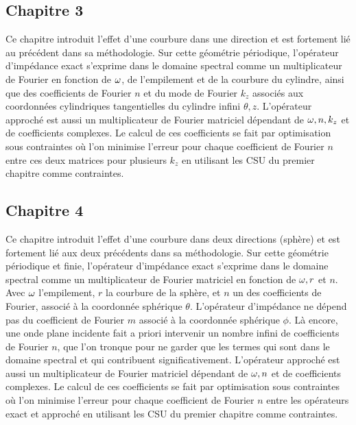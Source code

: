 \subsection*{Chapitre 3}
Ce chapitre introduit l'effet d'une courbure dans une direction et est fortement lié au précédent dans sa méthodologie.
Sur cette géométrie périodique, l'opérateur d'impédance exact s'exprime dans le domaine spectral comme un multiplicateur de Fourier en fonction de \(\omega\), de l'empilement et de la courbure du cylindre, ainsi que des coefficients de Fourier \(n\) et du mode de Fourier \(k_z\) associés aux coordonnées cylindriques tangentielles du cylindre infini \(\theta,z\).
L'opérateur approché est aussi un multiplicateur de Fourier matriciel dépendant de \(\omega, n, k_z\) et de coefficients complexes.
Le calcul de ces coefficients se fait par optimisation sous contraintes où l'on minimise l'erreur pour chaque coefficient de Fourier \(n\) entre ces deux matrices pour plusieurs \(k_z\) en utilisant les CSU du premier chapitre comme contraintes.

\subsection*{Chapitre 4}
Ce chapitre introduit l'effet d'une courbure dans deux directions (sphère) et est fortement lié aux deux précédents dans sa méthodologie.
Sur cette géométrie périodique et finie, l'opérateur d'impédance exact s'exprime dans le domaine spectral comme un multiplicateur de Fourier matriciel en fonction de \(\omega, r\) et \(n\). Avec \(\omega\) l'empilement, \(r\) la courbure de la sphère, et \(n\) un des coefficients de Fourier, associé à la coordonnée sphérique \(\theta\).
L'opérateur d'impédance ne dépend pas du coefficient de Fourier \(m\) associé à la coordonnée sphérique \(\phi\).
Là encore, une onde plane incidente fait a priori intervenir un nombre infini de coefficients de Fourier \(n\), que l'on tronque pour ne garder que les termes qui sont dans le domaine spectral et qui contribuent significativement.
L'opérateur approché est aussi un multiplicateur de Fourier matriciel dépendant de \(\omega, n\) et de coefficients complexes.
Le calcul de ces coefficients se fait par optimisation sous contraintes où l'on minimise l'erreur pour chaque coefficient de Fourier \(n\) entre les opérateurs exact et approché en utilisant les CSU du premier chapitre comme contraintes.

